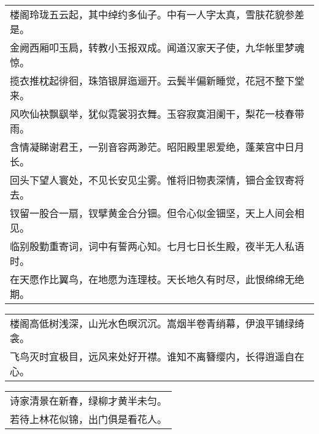 \begin{minipage}{\linewidth}
\begin{table}[H]
\begin{tabular}{@{}l@{}}
楼阁玲珑五云起，其中绰约多仙子。中有一人字太真，雪肤花貌参差是。\\
金阙西厢叩玉扃，转教小玉报双成。闻道汉家天子使，九华帐里梦魂惊。\\
揽衣推枕起徘徊，珠箔银屏迤逦开。云鬓半偏新睡觉，花冠不整下堂来。\\
风吹仙袂飘飖举，犹似霓裳羽衣舞。玉容寂寞泪阑干，梨花一枝春带雨。\\
含情凝睇谢君王，一别音容两渺茫。昭阳殿里恩爱绝，蓬莱宫中日月长。\\
回头下望人寰处，不见长安见尘雾。惟将旧物表深情，钿合金钗寄将去。\\
钗留一股合一扇，钗擘黄金合分钿。但令心似金钿坚，天上人间会相见。\\
临别殷勤重寄词，词中有誓两心知。七月七日长生殿，夜半无人私语时。\\
在天愿作比翼鸟，在地愿为连理枝。天长地久有时尽，此恨绵绵无绝期。
    \end{tabular}
  \end{table}
\end{minipage}
\vspace{1cm}


\nopagebreak%
\nopagebreak%
\noindent\begin{minipage}{\linewidth}
  \vskip-3pt\begin{table}[H]
    \centering
    \begin{tabular}{@{}l@{}}
楼阁高低树浅深，山光水色暝沉沉。嵩烟半卷青绡幕，伊浪平铺绿绮衾。\\
飞鸟灭时宜极目，远风来处好开襟。谁知不离簪缨内，长得逍遥自在心。
    \end{tabular}
  \end{table}
\end{minipage}
\vspace{1cm}


\nopagebreak%
\nopagebreak%
\noindent\begin{minipage}{\linewidth}
  \vskip-3pt\begin{table}[H]
    \centering
    \begin{tabular}{@{}l@{}}
诗家清景在新春，绿柳才黄半未匀。\\
若待上林花似锦，出门俱是看花人。
    \end{tabular}
  \end{table}
\end{minipage}
\vspace{1cm}


